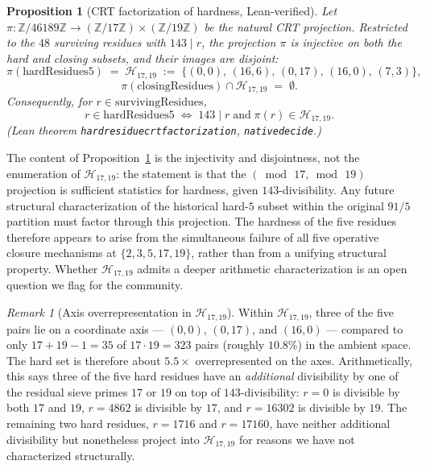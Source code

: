 \documentclass[11pt]{article}
\renewcommand{\_}{\origunderscore\allowbreak}
\newtheorem{proposition}[theorem]{Proposition}
\theoremstyle{definition}
\theoremstyle{remark}
\newtheorem{remark}[theorem]{Remark}
\begin{document}
\begin{proposition}[CRT factorization of hardness, Lean-verified]\label{prop:crt}
Let $\pi\colon \mathbb{Z}/46189\mathbb{Z}\to
(\mathbb{Z}/17\mathbb{Z})\times(\mathbb{Z}/19\mathbb{Z})$ be the
natural CRT projection. Restricted to the $48$ surviving residues
with $143\mid r$, the projection $\pi$ is injective on both the
hard and closing subsets, and their images are disjoint:
\[
  \pi(\mathrm{hardResidues5}) \;=\; \mathcal{H}_{17,19} \;:=\;
  \{(0,0),\,(16,6),\,(0,17),\,(16,0),\,(7,3)\},
\]
\[
  \pi(\mathrm{closingResidues}) \cap \mathcal{H}_{17,19} \;=\; \emptyset.
\]
Consequently, for $r\in\mathrm{survivingResidues}$,
\[
  r\in\mathrm{hardResidues5}
  \;\iff\;
  143\mid r \;\text{and}\; \pi(r)\in\mathcal{H}_{17,19}.
\]
(Lean theorem \texttt{hard\_residue\_crt\_factorization},
\texttt{native\_decide}.)
\end{proposition}

The content of Proposition~\ref{prop:crt} is the injectivity and
disjointness, not the enumeration of $\mathcal{H}_{17,19}$: the
statement is that the $(\bmod\,17,\bmod\,19)$ projection is
sufficient statistics for hardness, given $143$-divisibility. Any
future structural characterization of the historical hard-$5$ subset within the original $91/5$
partition must factor through this projection. The hardness of the
five residues therefore appears to arise from the simultaneous
failure of all five operative closure mechanisms at
$\{2,3,5,17,19\}$, rather than from a unifying structural property.
Whether $\mathcal{H}_{17,19}$ admits a deeper arithmetic
characterization is an open question we flag for the community.

\begin{remark}[Axis overrepresentation in $\mathcal{H}_{17,19}$]\label{rmk:axes}
Within $\mathcal{H}_{17,19}$, three of the five pairs lie on a
coordinate axis — $(0,0)$, $(0,17)$, and $(16,0)$ — compared to
only $17+19-1=35$ of $17\cdot 19 = 323$ pairs (roughly $10.8\%$)
in the ambient space. The hard set is therefore about $5.5\times$
overrepresented on the axes. Arithmetically, this says three of
the five hard residues have an \emph{additional} divisibility by
one of the residual sieve primes $17$ or $19$ on top of
$143$-divisibility: $r=0$ is divisible by both $17$ and $19$,
$r=4862$ is divisible by $17$, and $r=16302$ is divisible by $19$.
The remaining two hard residues, $r=1716$ and $r=17160$, have
neither additional divisibility but nonetheless project into
$\mathcal{H}_{17,19}$ for reasons we have not characterized
structurally.
\end{remark}
\end{document}
